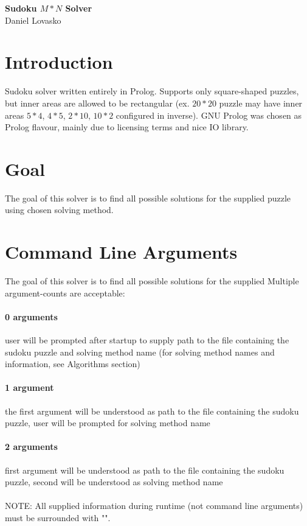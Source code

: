 \documentclass{article}
\begin{document}
	\begin{center}
	{\Huge \bf Sudoku $M*N$ Solver} \\
	{\large Daniel Lovasko} \\[1\baselineskip]
	\end{center}
\section*{Introduction}
Sudoku solver written entirely in Prolog. Supports only square-shaped puzzles,
but inner areas are allowed to be rectangular (ex. $20*20$ puzzle may have inner
areas $5*4$, $4*5$, $2*10$, $10*2$ configured in inverse). GNU Prolog was chosen as
Prolog flavour, mainly due to licensing terms and nice IO library.

\section{Goal} The goal of this solver is to find all possible solutions for
the supplied puzzle using chosen solving method.  

\section{Command Line Arguments} The goal of this solver is to find all
possible solutions for the supplied Multiple argument-counts are acceptable:
\paragraph{0 arguments} user will be prompted after startup to supply path to
the file containing the sudoku puzzle and solving method name (for solving
method names and information, see Algorithms section) 
\paragraph{1 argument} the first argument will be understood as path to the
file containing the sudoku puzzle, user will be prompted for solving method name 
\paragraph{2 arguments} first argument will be understood as path to the file
containing the sudoku puzzle, second will be understood as solving method name
\\
\\
NOTE: All supplied information during runtime (not command line arguments) must
be surrounded with "".
\end{document}
